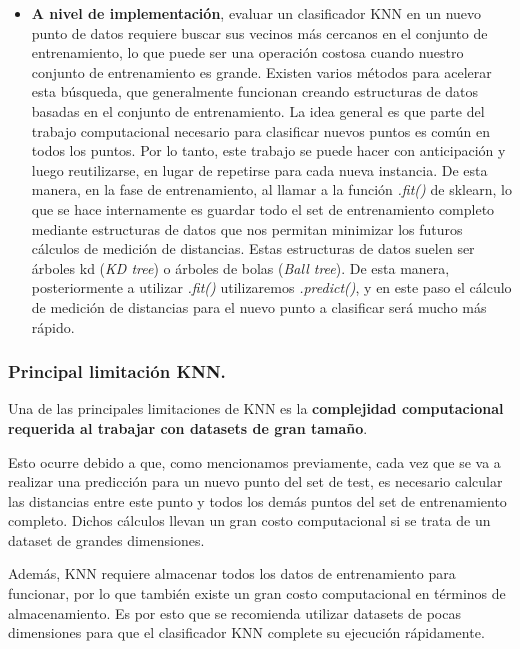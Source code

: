\documentclass[12pt,a4paper]{article}
\begin{document}
\begin{sloppypar}
\begin{itemize}
\item \textbf{A nivel de implementación}, evaluar un clasificador KNN en un nuevo punto de datos requiere buscar sus vecinos más cercanos en el conjunto de entrenamiento, lo que puede ser una operación costosa cuando nuestro conjunto de entrenamiento es grande. Existen varios métodos para acelerar esta búsqueda, que generalmente funcionan creando estructuras de datos basadas en el conjunto de entrenamiento. La idea general es que parte del trabajo computacional necesario para clasificar nuevos puntos es común en todos los puntos. Por lo tanto, este trabajo se puede hacer con anticipación y luego reutilizarse, en lugar de repetirse para cada nueva instancia. De esta manera, en la fase de entrenamiento, al llamar a la función \textit{.fit()} de sklearn, lo que se hace internamente es guardar todo el set de entrenamiento completo mediante estructuras de datos que nos permitan minimizar los futuros cálculos de medición de distancias. Estas estructuras de datos suelen ser árboles kd (\textit{KD tree}) o árboles de bolas (\textit{Ball tree}). De esta manera, posteriormente a utilizar \textit{.fit()} utilizaremos \textit{.predict()}, y en este paso el cálculo de medición de distancias para el nuevo punto a clasificar será mucho más rápido.\\
\end{itemize} 

\subsubsection{Principal limitación KNN.}

Una de las principales limitaciones de KNN\cite{KNN_limitacion} es la \textbf{complejidad computacional requerida al trabajar con datasets de gran tamaño}. 

Esto ocurre debido a que, como mencionamos previamente, cada vez que se va a realizar una predicción para un nuevo punto del set de test, es necesario calcular las distancias entre este punto y todos los demás puntos del set de entrenamiento completo. Dichos cálculos llevan un gran costo computacional si se trata de un dataset de grandes dimensiones. 

Además, KNN requiere almacenar todos los datos de entrenamiento para funcionar, por lo que también existe un gran costo computacional en términos de almacenamiento. Es por esto que se recomienda utilizar datasets de pocas dimensiones para que el clasificador KNN complete su ejecución rápidamente. \\


\end{sloppypar}
\end{document}
